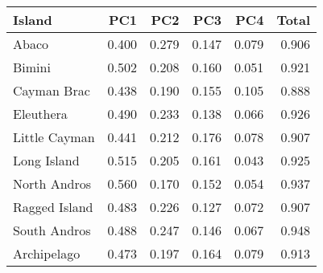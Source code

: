 
\begin{tabular}{lrrrrr}
\toprule
Island & PC1 & PC2 & PC3 & PC4 & Total\\
\midrule
Abaco & 0.400 & 0.279 & 0.147 & 0.079 & 0.906\\
Bimini & 0.502 & 0.208 & 0.160 & 0.051 & 0.921\\
Cayman Brac & 0.438 & 0.190 & 0.155 & 0.105 & 0.888\\
Eleuthera & 0.490 & 0.233 & 0.138 & 0.066 & 0.926\\
Little Cayman & 0.441 & 0.212 & 0.176 & 0.078 & 0.907\\
Long Island & 0.515 & 0.205 & 0.161 & 0.043 & 0.925\\
North Andros & 0.560 & 0.170 & 0.152 & 0.054 & 0.937\\
Ragged Island & 0.483 & 0.226 & 0.127 & 0.072 & 0.907\\
South Andros & 0.488 & 0.247 & 0.146 & 0.067 & 0.948\\
Archipelago & 0.473 & 0.197 & 0.164 & 0.079 & 0.913\\
\bottomrule
\end{tabular}
